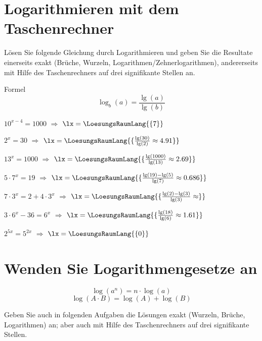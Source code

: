 \platzFuerBerechnungenBisEndeSeite{}

\section{Logarithmieren mit dem Taschenrechner}
Lösen Sie folgende Gleichung durch Logarithmieren und geben Sie die
Resultate einerseits exakt (Brüche, Wurzeln, Logarithmen/Zehnerlogarithmen), andererseits mit
Hilfe des Taschenrechners auf drei signifikante Stellen an.

Formel
$$\log_b(a) = \frac{\lg(a)}{\lg(b)}$$

\begin{bbwAufgabenBlock}
\item $10^{x-4}=1000$ $\Longrightarrow$ $\lx=\LoesungsRaumLang{\{7\}}$ \plz{}
\item $2^x=30$ $\Longrightarrow$ $\lx=\LoesungsRaumLang{\{\frac{\lg(30)}{\lg(2)}\approx 4.91}\}$ \plz{}\noTRAINER{\newpage}
\item $13^x=1000$ $\Longrightarrow$ $\lx=\LoesungsRaumLang{\{\frac{\lg(1000)}{\lg(13)}\approx 2.69\}}$ \plz{}
\item $5\cdot{}7^x = 19$ $\Longrightarrow$ $\lx=\LoesungsRaumLang{\{\frac{\lg(19)-\lg(5)}{\lg(7)}\approx 0.686\}}$ \plz{}
\item $7\cdot{}3^x = 2 + 4\cdot{}3^x$ $\Longrightarrow$ $\lx=\LoesungsRaumLang{\{\frac{\lg(2)-\lg(3)}{\lg(3)}\approx  \}}$ \plz{}\noTRAINER{\newpage}
\item $3\cdot{}6^x - 36 = 6^x$ $\Longrightarrow$ $\lx=\LoesungsRaumLang{\{\frac{\lg(18)}{\lg(6)} \approx  1.61 \}}$ \plz{}
\item $2^{5x} = 5^{2x}$ $\Longrightarrow$ $\lx=\LoesungsRaumLang{\{0\}}$ \plz{}
\end{bbwAufgabenBlock}

\platzFuerBerechnungenBisEndeSeite{}

\section{Wenden Sie Logarithmengesetze an}

$$\log(a^n) = n\cdot{}\log(a)$$
$$\log(A\cdot{}B) = \log(A) + \log(B)$$

Geben Sie auch in folgenden Aufgaben die Lösungen exakt (Wurzeln,
Brüche, Logarithmen) an; aber auch mit Hilfe des Taschenrechners auf drei
signifikante Stellen.


